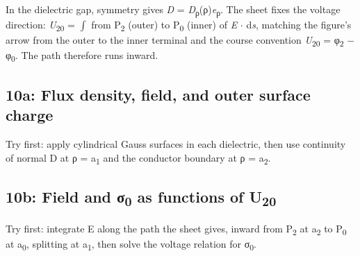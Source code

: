\documentclass[11pt]{article}
\begin{document}
\begin{keepsection}
\begin{center}
\begin{minipage}[t]{0.950\linewidth}
\par{}\end{minipage}
\end{center}

In the dielectric gap, symmetry gives \textit{D} = \textit{D}\textsubscript{ρ}(ρ)\textit{e}\textsubscript{ρ}. The sheet fixes the voltage direction: \textit{U}\textsubscript{20} = $\int $ from P\textsubscript{2} (outer) to P\textsubscript{0} (inner) of \textit{E} \ensuremath{\cdot} d\textit{s}, matching the figure’s arrow from the outer to the inner terminal and the course convention \textit{U}\textsubscript{20} = φ\textsubscript{2} \ensuremath{-} φ\textsubscript{0}. The path therefore runs inward.

\begin{keepsection}
\subsection{10a: Flux density, field, and outer surface charge}

Try first: apply cylindrical Gauss surfaces in each dielectric, then use continuity of normal D at ρ = a\textsubscript{1} and the conductor boundary at ρ = a\textsubscript{2}.

\end{keepsection}

\begin{keepsection}
\subsection{10b: Field and σ\textsubscript{0} as functions of U\textsubscript{20}}

Try first: integrate E along the path the sheet gives, inward from P\textsubscript{2} at a\textsubscript{2} to P\textsubscript{0} at a\textsubscript{0}, splitting at a\textsubscript{1}, then solve the voltage relation for σ\textsubscript{0}.


\end{keepsection}
\end{keepsection}
\end{document}
